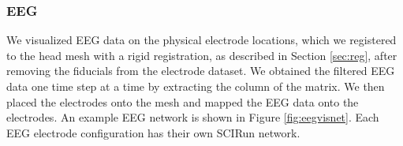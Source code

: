 \subsubsection{EEG}

We visualized EEG data on the physical electrode locations, which we registered to the head mesh with a rigid registration, as described in Section \ref{sec:reg}, after removing the fiducials from the electrode dataset. We obtained the filtered EEG data one time step at a time by extracting the column of the matrix. We then placed the electrodes onto the mesh and mapped the EEG data onto the electrodes. An example EEG network is shown in Figure \ref{fig:eegvisnet}. Each EEG electrode configuration has their own SCIRun network.


